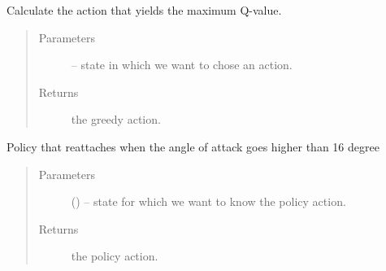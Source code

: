 \documentclass[letterpaper,10pt,english]{sphinxmanual}
\begin{document}
\begin{fulllineitems}
\begin{quote}
\begin{description}
\end{description}\end{quote}

\begin{fulllineitems}
\label{\detokenize{package2:policyLearning.PolicyLearner.act}}
Calculate the action that yields the maximum Q-value.
\begin{quote}\begin{description}
\item[{Parameters}] \leavevmode
{} -- state in which we want to chose an action.

\item[{Returns}] \leavevmode
the greedy action.

\end{description}\end{quote}

\end{fulllineitems}


\begin{fulllineitems}
\label{\detokenize{package2:policyLearning.PolicyLearner.actDeterministicallyUnderPolicy}}
Policy that reattaches when the angle of attack goes higher than 16 degree
\begin{quote}\begin{description}
\item[{Parameters}] \leavevmode
{} () -- state for which we want to know the policy action.

\item[{Returns}] \leavevmode
the policy action.

\end{description}\end{quote}

\end{fulllineitems}


\begin{fulllineitems}
\label{\detokenize{package2:policyLearning.PolicyLearner.actRandomly}}
\end{fulllineitems}


\end{fulllineitems}
\end{document}
